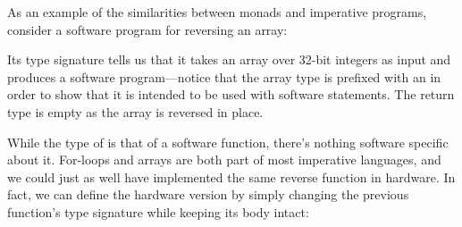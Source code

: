 \documentclass[../paper.tex]{subfiles}
\begin{document}
As an example of the similarities between monads and imperative programs, consider a software program for reversing an array:


\noindent Its type signature tells us that it takes an array over 32-bit integers as input and produces a software program---notice that the array type  is prefixed with an  in order to show that it is intended to be used with software statements. The return type is empty as the array is reversed in place.




While the type of  is that of a software function, there's nothing software specific about it. For-loops and arrays are both part of most imperative languages, and we could just as well have implemented the same reverse function in hardware. In fact, we can define the hardware version by simply changing the previous function's type signature while keeping its body intact:
\end{document}
